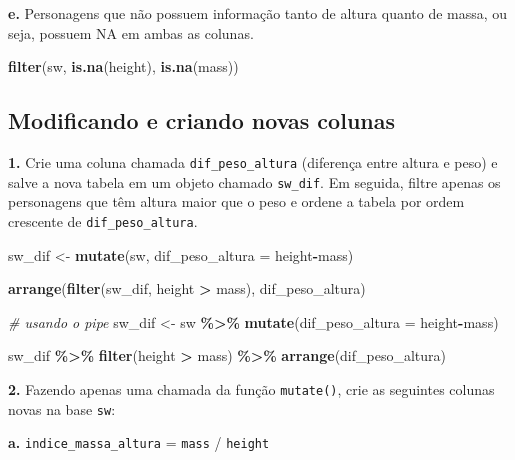 \documentclass[
]{book}
\newenvironment{Shaded}{\begin{snugshade}}{\end{snugshade}}
\newcommand{\AttributeTok}[1]{\textcolor[rgb]{0.13,0.29,0.53}{#1}}
\newcommand{\CommentTok}[1]{\textcolor[rgb]{0.56,0.35,0.01}{\textit{#1}}}
\newcommand{\FunctionTok}[1]{\textcolor[rgb]{0.13,0.29,0.53}{\textbf{#1}}}
\newcommand{\NormalTok}[1]{#1}
\newcommand{\OtherTok}[1]{\textcolor[rgb]{0.56,0.35,0.01}{#1}}
\newcommand{\SpecialCharTok}[1]{\textcolor[rgb]{0.81,0.36,0.00}{\textbf{#1}}}
\begin{document}
\textbf{e.} Personagens que não possuem informação tanto de altura quanto de
massa, ou seja, possuem NA em ambas as colunas.

\begin{Shaded}
\begin{Highlighting}[]
\FunctionTok{filter}\NormalTok{(sw, }\FunctionTok{is.na}\NormalTok{(height), }\FunctionTok{is.na}\NormalTok{(mass))}
\end{Highlighting}
\end{Shaded}

\subsection{Modificando e criando novas colunas}\label{modificando-e-criando-novas-colunas}

\textbf{1.} Crie uma coluna chamada \texttt{dif\_peso\_altura} (diferença entre altura
e peso) e salve a nova tabela em um objeto chamado \texttt{sw\_dif}. Em seguida,
filtre apenas os personagens que têm altura maior que o peso e ordene a
tabela por ordem crescente de \texttt{dif\_peso\_altura}.

\begin{Shaded}
\begin{Highlighting}[]
\NormalTok{sw\_dif }\OtherTok{\textless{}{-}} \FunctionTok{mutate}\NormalTok{(sw, }\AttributeTok{dif\_peso\_altura =}\NormalTok{ height}\SpecialCharTok{{-}}\NormalTok{mass)}

\FunctionTok{arrange}\NormalTok{(}\FunctionTok{filter}\NormalTok{(sw\_dif, height }\SpecialCharTok{\textgreater{}}\NormalTok{ mass), dif\_peso\_altura)}

\CommentTok{\# usando o pipe}
\NormalTok{sw\_dif }\OtherTok{\textless{}{-}}\NormalTok{ sw }\SpecialCharTok{\%\textgreater{}\%} 
  \FunctionTok{mutate}\NormalTok{(}\AttributeTok{dif\_peso\_altura =}\NormalTok{ height}\SpecialCharTok{{-}}\NormalTok{mass)}

\NormalTok{sw\_dif }\SpecialCharTok{\%\textgreater{}\%} 
  \FunctionTok{filter}\NormalTok{(height }\SpecialCharTok{\textgreater{}}\NormalTok{ mass) }\SpecialCharTok{\%\textgreater{}\%} 
  \FunctionTok{arrange}\NormalTok{(dif\_peso\_altura)}
\end{Highlighting}
\end{Shaded}

\textbf{2.} Fazendo apenas uma chamada da função \texttt{mutate()}, crie as
seguintes colunas novas na base \texttt{sw}:

\textbf{a.} \texttt{indice\_massa\_altura} = \texttt{mass} / \texttt{height}
\end{document}
